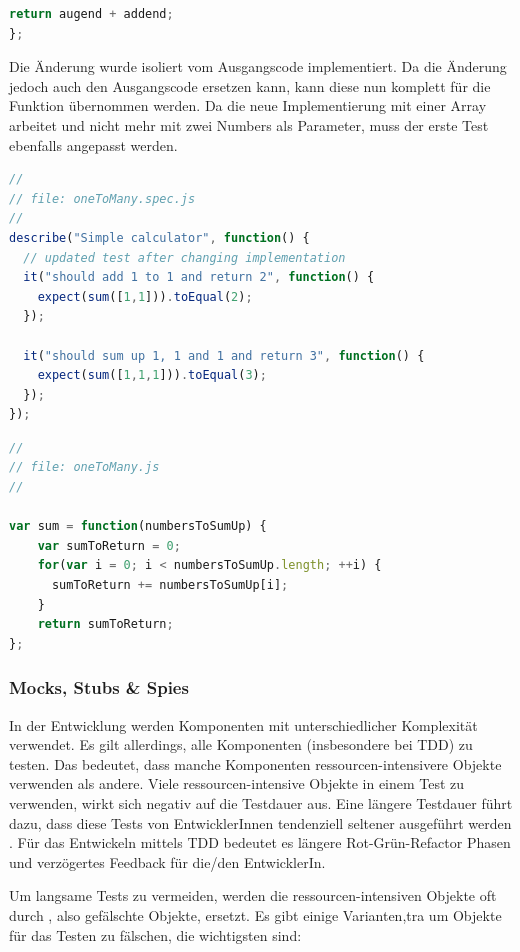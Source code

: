 {\begin{lstlisting}[language=JavaScript]
  return augend + addend;
};
\end{lstlisting}

Die Änderung wurde isoliert vom Ausgangscode implementiert. Da die Änderung jedoch auch den Ausgangscode ersetzen kann, kann diese nun komplett für die Funktion  übernommen werden. Da die neue Implementierung mit einer Array arbeitet und nicht mehr mit zwei Numbers als Parameter, muss der erste Test ebenfalls angepasst werden.

\begin{lstlisting}[language=JavaScript]
//
// file: oneToMany.spec.js
//
describe("Simple calculator", function() {
  // updated test after changing implementation
  it("should add 1 to 1 and return 2", function() {
    expect(sum([1,1])).toEqual(2);
  });

  it("should sum up 1, 1 and 1 and return 3", function() {
    expect(sum([1,1,1])).toEqual(3);
  });
});
\end{lstlisting}

\begin{lstlisting}[language=JavaScript]
//
// file: oneToMany.js
//

var sum = function(numbersToSumUp) {
    var sumToReturn = 0;
    for(var i = 0; i < numbersToSumUp.length; ++i) {
      sumToReturn += numbersToSumUp[i];
    }
    return sumToReturn;
};
\end{lstlisting}

\subsubsection{Mocks, Stubs \& Spies}
In der Entwicklung werden Komponenten mit unterschiedlicher Komplexität verwendet. Es gilt allerdings, alle Komponenten (insbesondere bei TDD) zu testen. Das bedeutet, dass manche Komponenten ressourcen-intensivere Objekte verwenden als andere. Viele ressourcen-intensive Objekte in einem Test zu verwenden, wirkt sich negativ auf die Testdauer aus. Eine längere Testdauer führt dazu, dass diese Tests von EntwicklerInnen tendenziell seltener ausgeführt werden \autocite[4]{Johansen:2011}. Für das Entwickeln mittels TDD bedeutet es längere Rot-Grün-Refactor Phasen und verzögertes Feedback für die/den EntwicklerIn.

Um langsame Tests zu vermeiden, werden die ressourcen-intensiven Objekte oft durch , also gefälschte Objekte, ersetzt. Es gibt einige Varianten,tra um Objekte für das Testen zu fälschen, die wichtigsten sind:

}
